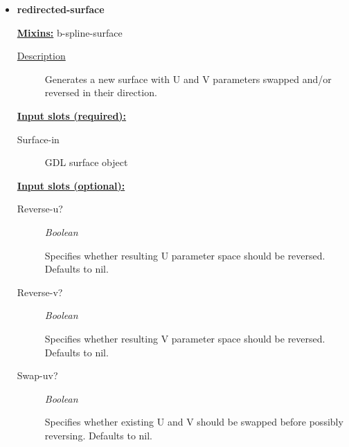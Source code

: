 \documentclass [11pt]{book}
\begin{document}
\begin{itemize}
\item {}
\label{prim:redirected-surface}
\textbf{redirected-surface}


\textbf{
\underline{Mixins:}} b-spline-surface





\begin{description}

\item [
\underline{Description}]


Generates a new surface with U and V parameters swapped and/or
   reversed in their direction.



\end{description}








\textbf{
\underline{Input slots (required):}}

\begin{description}

\item [Surface-in]

GDL surface object




\end{description}






\textbf{
\underline{Input slots (optional):}}

\begin{description}

\item [Reverse-u?]
\emph{Boolean}

 Specifies whether resulting U parameter space should be reversed. Defaults to nil.




\item [Reverse-v?]
\emph{Boolean}

 Specifies whether resulting V parameter space should be reversed. Defaults to nil.




\item [Swap-uv?]
\emph{Boolean}

 Specifies whether existing U and V should be swapped before possibly reversing. Defaults to nil.





\end{description}
\end{itemize}
\end{document}
